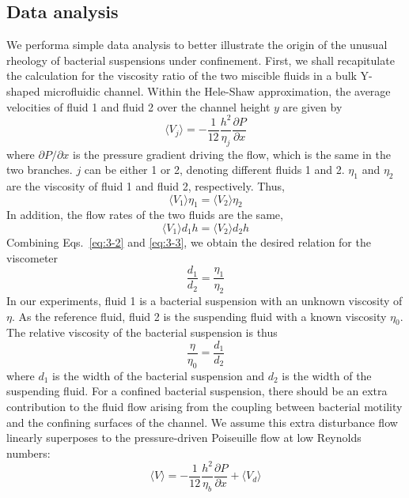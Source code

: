 \subsection{Data analysis}
We performa simple data analysis to better illustrate the origin of the unusual rheology of bacterial suspensions under confinement.
First, we shall recapitulate the calculation for the viscosity ratio of the two miscible fluids in a bulk Y-shaped microfluidic channel. Within the Hele-Shaw approximation, the average velocities of fluid 1 and fluid 2 over the channel height $y$ are given by \cite{Lamb1932}
\begin{equation}
  \langle V_j \rangle = -\frac{1}{12}\frac{h^2}{\eta_j}\frac{\partial P}{\partial x}
\end{equation}
where $\partial P/\partial x$ is the pressure gradient driving the flow, which is the same in the two branches. $j$ can be either 1 or 2, denoting different fluids 1 and 2. $\eta_1$ and $\eta_2$ are the viscosity of fluid 1 and fluid 2, respectively. Thus,
\begin{equation}
  \label{eq:3-2}
  \langle V_1 \rangle \eta_1 = \langle V_2 \rangle \eta_2
\end{equation}
In addition, the flow rates of the two fluids are the same,
\begin{equation}
  \label{eq:3-3}
  \langle V_1 \rangle d_1 h = \langle V_2 \rangle d_2 h
\end{equation}
Combining Eqs.~\ref{eq:3-2} and \ref{eq:3-3}, we obtain the desired relation for the viscometer
$$
	\frac{d_1}{d_2} = \frac{\eta_1}{\eta_2}
$$
In our experiments, fluid 1 is a bacterial suspension with an unknown viscosity of $\eta$. As the reference fluid, fluid 2 is the suspending fluid with a known viscosity $\eta_0$. The relative viscosity of the bacterial suspension is thus \cite{Gachelin2013}
\begin{equation}
  \label{eq:3-4}
  \frac{\eta}{\eta_0} = \frac{d_1}{d_2}
\end{equation}
where $d_1$ is the width of the bacterial suspension and $d_2$ is the width of the suspending fluid. For a confined bacterial suspension, there should be an extra contribution to the fluid flow arising from the coupling between bacterial motility and the confining surfaces of the channel. We assume this extra disturbance flow linearly superposes to the pressure-driven Poiseuille flow at low Reynolds numbers:
\begin{equation}
  \label{eq:3-5}
  \langle V \rangle = -\frac{1}{12}\frac{h^2}{\eta_b}\frac{\partial P}{\partial x} + \langle V_d \rangle
\end{equation}
